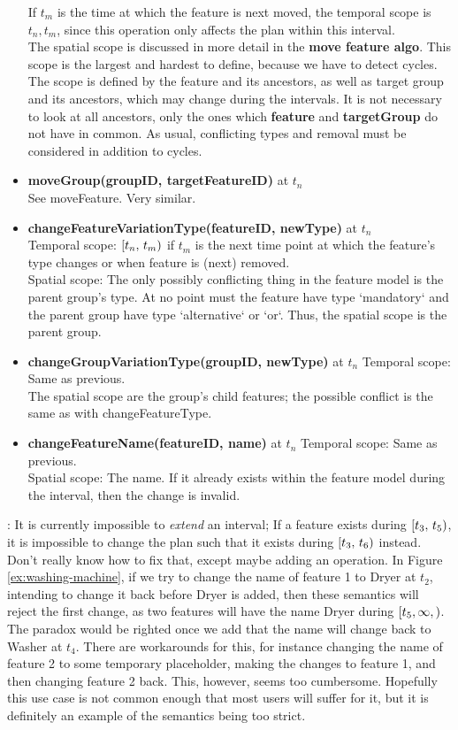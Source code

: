 \begin{itemize}
  If $t_m$ is the time at which the feature is next moved, the temporal scope is $t_n, t_m$, since this operation only affects the plan within this interval.\\
  The spatial scope is discussed in more detail in the \textbf{move feature algo}. This scope is the largest and hardest to define, because we have to detect cycles. The scope is defined by the feature and its ancestors, as well as target group and its ancestors, which may change during the intervals. It is not necessary to look at all ancestors, only the ones which \textbf{feature} and \textbf{targetGroup} do not have in common. As usual, conflicting types and removal must be considered in addition to cycles.
  \item \textbf{moveGroup(groupID, targetFeatureID)} at $t_n$\\
    See moveFeature. Very similar.
  \item \textbf{changeFeatureVariationType(featureID, newType)} at $t_n$\\
    Temporal scope: $[t_n,\, t_m)$ if $t_m$ is the next time point at which the feature's type changes or when feature is (next) removed.\\
    Spatial scope: The only possibly conflicting thing in the feature model is the parent group's type. At no point must the feature have type `mandatory` and the parent group have type `alternative` or `or`. Thus, the spatial scope is the parent group.\\
  \item \textbf{changeGroupVariationType(groupID, newType)} at $t_n$
    Temporal scope: Same as previous.\\
    The spatial scope are the group's child features; the possible conflict is the same as with changeFeatureType.\\
  \item \textbf{changeFeatureName(featureID, name)} at $t_n$
    Temporal scope: Same as previous.\\
    Spatial scope: The name. If it already exists within the feature model during the interval, then the change is invalid. 
\end{itemize}

: It is currently impossible to \emph{extend} an interval; If a feature exists during $[t_3,\, t_5)$, it is impossible to change the plan such that it exists during $[t_3,\, t_6)$ instead. Don't really know how to fix that, except maybe adding an operation. In Figure \vref{ex:washing-machine}, if we try to change the name of feature 1 to Dryer at $t_2$, intending to change it back before Dryer is added, then these semantics will reject the first change, as two features will have the name Dryer during $\interval{t_5, \infty}$. The paradox would be righted once we add that the name will change back to Washer at $t_4$. There are workarounds for this, for instance changing the name of feature 2 to some temporary placeholder, making the changes to feature 1, and then changing feature 2 back. This, however, seems too cumbersome. Hopefully this use case is not common enough that most users will suffer for it, but it is definitely an example of the semantics being too strict. 
